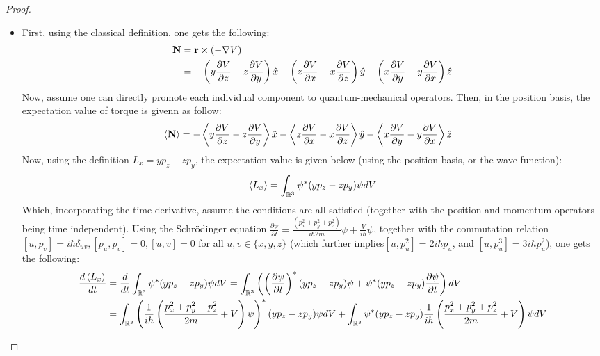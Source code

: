\documentclass{article}
\begin{document}
\begin{proof}

    \hfil

    \begin{itemize}
        \item[(a)] First, using the classical definition, one gets the following:
        \begin{align}
            \mathbf{N} &= \mathbf{r} \times (-\nabla V) \\
            &= -\left(y\frac{\partial V}{\partial z}-z\frac{\partial V}{\partial y}\right)\hat{x}-\left(z\frac{\partial V}{\partial x}-x\frac{\partial V}{\partial z}\right)\hat{y}-\left(x\frac{\partial V}{\partial y}-y\frac{\partial V}{\partial x}\right)\hat{z}
        \end{align}
        Now, assume one can directly promote each individual component to quantum-mechanical operators. Then, in the position basis, the expectation value of torque is givenn as follow:
        \begin{align}
            \left<\mathbf{N}\right> &= -\left<y\frac{\partial V}{\partial z}-z\frac{\partial V}{\partial y}\right>\hat{x}-\left<z\frac{\partial V}{\partial x}-x\frac{\partial V}{\partial z}\right>\hat{y}-\left<x\frac{\partial V}{\partial y}-y\frac{\partial V}{\partial x}\right>\hat{z}
        \end{align}
        Now, using the definition $L_x = yp_z-zp_y$, the expectation value is given below (using the position basis, or the wave function):
        \begin{align}
            \left<L_x\right> = \int_{\mathbb{R}^3}\psi^*(yp_z-zp_y)\psi dV
        \end{align}
        Which, incorporating the time derivative, assume the conditions are all satisfied (together with the position and momentum operators being time independent). Using the Schr\"odinger equation $\frac{\partial\psi}{\partial t} = \frac{(p_x^2+p_y^2+p_z^2)}{i\hbar 2m}\psi + \frac{V}{i\hbar}\psi$, together with the commutation relation $[u,p_v] = i\hbar\delta_{uv}, [p_u,p_v]=0, [u,v]=0$ for all $u,v \in \{x,y,z\}$ (which further implies$[u,p_u^2]=2i\hbar p_u$, and $[u,p_u^3] = 3i\hbar p_u^2$), one gets the following:
        \begin{align}
            \frac{d\left<L_x\right>}{dt} &= \frac{d}{dt}\int_{\RR^3}\psi^*(yp_z-zp_y)\psi dV = \int_{\RR^3}\left(\left(\frac{\partial \psi}{\partial t}\right)^*(yp_z-zp_y)\psi + \psi^*(yp_z-zp_y)\frac{\partial\psi}{\partial t}\right)dV\\
            &= \int_{\RR^3}\left(\frac{1}{i\hbar}\left(\frac{p_x^2+p_y^2+p_z^2}{2m}+V\right)\psi\right)^*(yp_z-zp_y)\psi dV + \int_{\RR^3}\psi^*(yp_z-zp_y)\frac{1}{i\hbar}\left(\frac{p_x^2+p_y^2+p_z^2}{2m}+V\right)\psi dV\\

\end{align}
\end{itemize}
\end{proof}
\end{document}
